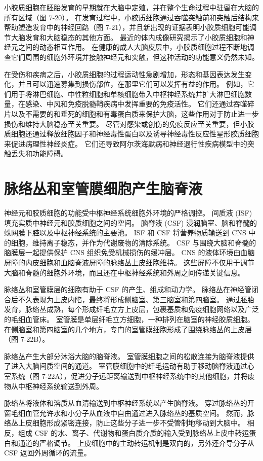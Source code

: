 小胶质细胞在胚胎发育的早期就在大脑中定殖，并在整个生命过程中驻留在大脑的所有区域（图 7-20）。 在发育过程中，小胶质细胞通过吞噬突触前和突触后结构来帮助塑造发育中的神经回路（图 7-21），并且新出现的证据表明小胶质细胞可能调节大脑发育和大脑稳态的其他方面。 最近的体内成像研究揭示了小胶质细胞和神经元之间的动态相互作用。 在健康的成人大脑皮层中，小胶质细胞过程不断地调查它们周围的细胞外环境并接触神经元和突触，但这种活动的功能意义仍然未知。

在受伤和疾病之后，小胶质细胞的过程运动性急剧增加，形态和基因表达发生变化，并且可以迅速募集到损伤部位，在那里它们可以发挥有益的作用。 例如，它们用于将淋巴细胞、中性粒细胞和单核细胞带入中枢神经系统并扩大淋巴细胞数量，在感染、中风和免疫脱髓鞘疾病中发挥重要的免疫活性。 它们还通过吞噬碎片以及不需要的和垂死的细胞和有毒蛋白质来保护大脑，这些作用对于防止进一步损伤和维持大脑稳态至关重要。 尽管对感染或创伤的免疫反应至关重要，但小胶质细胞还通过释放细胞因子和神经毒性蛋白以及诱导神经毒性反应性星形胶质细胞来促进病理性神经炎症。 它们还导致阿尔茨海默病和神经退行性疾病模型中的突触丢失和功能障碍。


\section{脉络丛和室管膜细胞产生脑脊液}

神经元和胶质细胞的功能受中枢神经系统细胞外环境的严格调控。 间质液 (ISF) 填充实质中神经元和胶质细胞之间的空间。 脑脊液 (CSF) 浸润脑室、脑和脊髓的蛛网膜下腔以及中枢神经系统的主要池。 ISF 和 CSF 将营养物质输送到 CNS 中的细胞，维持离子稳态，并作为代谢废物的清除系统。 CSF 与围绕大脑和脊髓的脑膜层一起提供保护 CNS 组织免受机械损伤的缓冲层。 CNS 的液体环境由血脑屏障的内皮细胞和血脑脊液屏障的脉络丛上皮细胞维持。 这些屏障不仅用于调节大脑和脊髓的细胞外环境，而且还在中枢神经系统和外周之间传递关键信息。

脉络丛和室管膜层的细胞有助于 CSF 的产生、组成和动力学。 脉络丛在神经管闭合后不久表现为上皮内陷，最终将形成侧脑室、第三脑室和第四脑室。 通过胚胎发育，脉络丛成熟，每个形成纤毛立方上皮层，包裹基质和免疫细胞网络以及广泛的毛细血管床。 室管膜是单层纤毛立方细胞，一种排列在脑室的神经胶质细胞。 在侧脑室和第四脑室的几个地方，专门的室管膜细胞形成了围绕脉络丛的上皮层（图 7-22B）。

脉络丛产生大部分沐浴大脑的脑脊液。 室管膜细胞之间的松散连接为脑脊液提供了进入大脑间质空间的通道。 室管膜细胞中的纤毛运动有助于移动脑脊液通过心室系统（图 7-22A），促进分子远距离输送到中枢神经系统中的其他细胞，并将废物从中枢神经系统输送到外周。

脉络丛将液体和溶质从血清输送到中枢神经系统以产生脑脊液。 穿过脉络丛的开窗毛细血管允许水和小分子从血液中自由通过进入脉络丛的基质空间。 然而，脉络丛上皮细胞形成紧密连接，防止这些分子进一步不受管制地移动到大脑中。 相反，组成 CSF 的水、离子、代谢物和蛋白质介质的输入受到脉络丛上皮中转运蛋白和通道的严格调节。 上皮细胞中的主动转运机制是双向的，另外还介导分子从 CSF 返回外周循环的流量。

